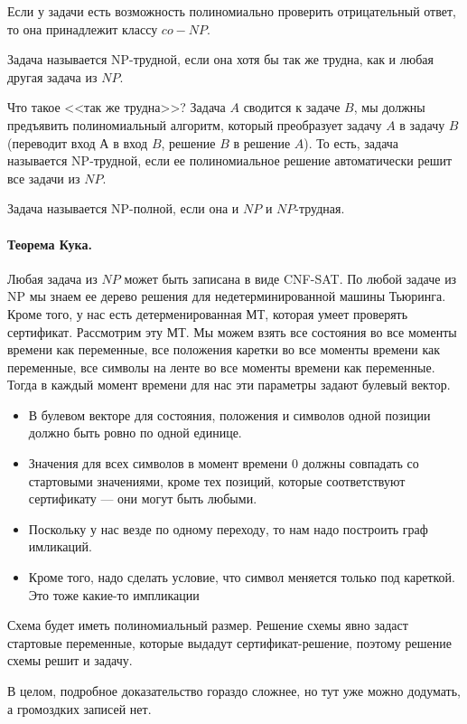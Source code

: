 \documentclass[12pt]{article}
\begin{document}
Если у задачи есть возможность полиномиально проверить отрицательный ответ, то она принадлежит классу $co-NP$. 

Задача называется NP-трудной, если она хотя бы так же трудна, как и любая другая задача из $NP$. 

Что такое <<так же трудна>>? Задача $A$ сводится к задаче $B$, мы должны предъявить полиномиальный алгоритм, который преобразует задачу $A$ в задачу $B$ (переводит вход $А$ в вход $B$, решение $B$ в решение $A$). То есть, задача называется NP-трудной, если ее полиномиальное решение автоматически решит все задачи из $NP$.

Задача называется NP-полной, если она и $NP$ и $NP$-трудная.

\paragraph{Теорема Кука.} Любая задача из $NP$ может быть записана в виде CNF-SAT. По любой задаче из NP мы знаем ее дерево решения для недетерминированной машины Тьюринга. Кроме того, у нас есть детерменированная МТ, которая умеет проверять сертификат. Рассмотрим эту МТ. Мы можем взять все состояния во все моменты времени как переменные, все положения каретки во все моменты времени как переменные, все символы на ленте во все моменты времени как переменные. Тогда в каждый момент времени для нас эти параметры задают булевый вектор. 

\begin{itemize}
\item В булевом векторе для состояния, положения и символов одной позиции должно быть ровно по одной единице.
\item Значения для всех символов в момент времени 0 должны совпадать со стартовыми значениями, кроме тех позиций, которые соответствуют сертификату --- они могут быть любыми.
\item Поскольку у нас везде по одному переходу, то нам надо построить граф имликаций.
\item Кроме того, надо сделать условие, что символ меняется только под кареткой. Это тоже какие-то импликации
\end{itemize}

Схема будет иметь полиномиальный размер. Решение схемы явно задаст стартовые переменные, которые выдадут сертификат-решение, поэтому решение схемы решит и задачу.

В целом, подробное доказательство гораздо сложнее, но тут уже можно додумать, а громоздких записей нет.
\end{document}
